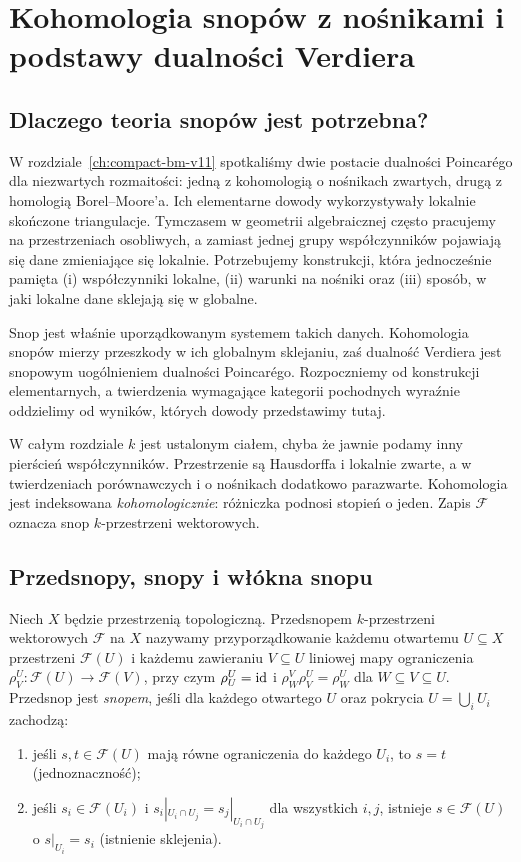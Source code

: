 \chapter{Kohomologia snopów z nośnikami i podstawy dualności Verdiera}
\label{ch:snopy-verdier-v12}

\section{Dlaczego teoria snopów jest potrzebna?}
W rozdziale~\ref{ch:compact-bm-v11} spotkaliśmy dwie postacie dualności
Poincarégo dla niezwartych rozmaitości: jedną z kohomologią o nośnikach
zwartych, drugą z homologią Borel--Moore'a. Ich elementarne dowody
wykorzystywały lokalnie skończone triangulacje. Tymczasem w geometrii
algebraicznej często pracujemy na przestrzeniach osobliwych, a zamiast
jednej grupy współczynników pojawiają się dane zmieniające się lokalnie.
Potrzebujemy konstrukcji, która jednocześnie pamięta (i) współczynniki
lokalne, (ii) warunki na nośniki oraz (iii) sposób, w jaki lokalne
dane sklejają się w globalne.

Snop jest właśnie uporządkowanym systemem takich danych. Kohomologia
snopów mierzy przeszkody w ich globalnym sklejaniu, zaś dualność Verdiera
jest snopowym uogólnieniem dualności Poincarégo. Rozpoczniemy od
konstrukcji elementarnych, a twierdzenia wymagające kategorii pochodnych
wyraźnie oddzielimy od wyników, których dowody przedstawimy tutaj.

W całym rozdziale $k$ jest ustalonym ciałem, chyba że jawnie podamy inny
pierścień współczynników. Przestrzenie są Hausdorffa i lokalnie zwarte,
a w twierdzeniach porównawczych i o nośnikach dodatkowo parazwarte.
Kohomologia jest indeksowana \emph{kohomologicznie}: różniczka podnosi
stopień o jeden. Zapis $\mathcal F$ oznacza snop $k$-przestrzeni wektorowych.

\section{Przedsnopy, snopy i włókna snopu}
\begin{definicja}
\label{def:sheaf-v12}
Niech $X$ będzie przestrzenią topologiczną. Przedsnopem
$k$-przestrzeni wektorowych $\mathcal F$ na $X$ nazywamy przyporządkowanie
każdemu otwartemu $U\subseteq X$ przestrzeni $\mathcal F(U)$ i każdemu
zawieraniu $V\subseteq U$ liniowej mapy ograniczenia
$\rho^U_V:\mathcal F(U)\to\mathcal F(V)$, przy czym
$\rho^U_U=\mathrm{id}$ i $\rho^V_W\rho^U_V=\rho^U_W$ dla $W\subseteq V\subseteq U$.
Przedsnop jest \emph{snopem}, jeśli dla każdego otwartego $U$ oraz
pokrycia $U=\bigcup_iU_i$ zachodzą:
\begin{enumerate}[label=(\roman*)]
\item jeśli $s,t\in\mathcal F(U)$ mają równe ograniczenia do każdego $U_i$,
  to $s=t$ (jednoznaczność);
\item jeśli $s_i\in\mathcal F(U_i)$ i
  $s_i|_{U_i\cap U_j}=s_j|_{U_i\cap U_j}$ dla wszystkich $i,j$,
  istnieje $s\in\mathcal F(U)$ o $s|_{U_i}=s_i$ (istnienie sklejenia).
\end{enumerate}
\end{definicja}

